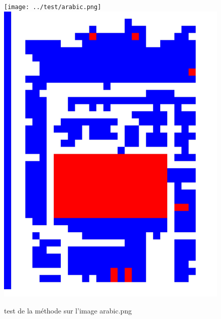 \documentclass{book}
\begin{document}
\begin{figure}[H]
\begin{center}
\texttt{[image: ../test/arabic.png]}
\includegraphics[scale=0.05]{../test/arabic_res_hog_hsv_kmeans.jpg}
\end{center}
\caption{test de la méthode sur l'image arabic.png}
\label{test1}
\end{figure}
\end{document}
